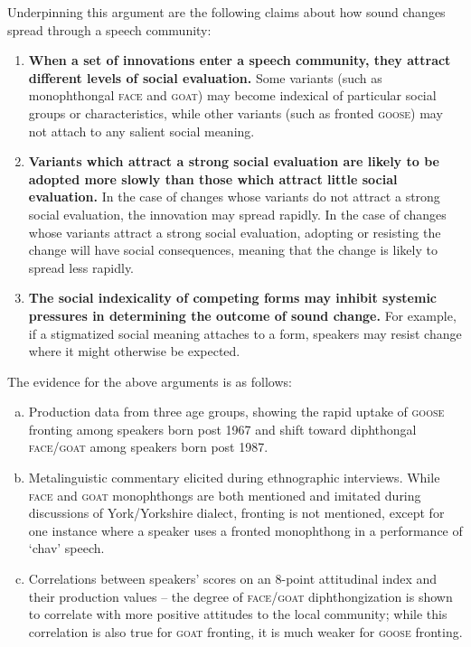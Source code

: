 \documentclass{article}
\begin{document}
Underpinning this argument are the following claims about how sound changes spread through a speech community:

\begin{enumerate}[i]

\item{\textbf{When a set of innovations enter a speech community, they attract different levels of social evaluation.} Some variants (such as monophthongal \textsc{\textsc{face}} and \textsc{\textsc{goat}}) may become indexical of particular social groups or characteristics, while other variants (such as fronted \textsc{\textsc{goose}}) may not attach to any salient social meaning.}
\item{\textbf{Variants which attract a strong social evaluation are likely to be adopted more slowly than those which attract little social evaluation.} In the case of changes whose variants do not attract a strong social evaluation, the innovation may spread rapidly. In the case of changes whose variants attract a strong social evaluation, adopting or resisting the change will have social consequences, meaning that the change is likely to spread less rapidly.}
\item{\textbf{The social indexicality of competing forms may inhibit systemic pressures in determining the outcome of sound change.} For example, if a stigmatized social meaning attaches to a form, speakers may resist change where it might otherwise be expected.}
\end{enumerate}

The evidence for the above arguments is as follows:

\begin{enumerate}[(a)]
\item{Production data from three age groups, showing the rapid uptake of \textsc{goose} fronting among speakers born post 1967 and shift toward diphthongal \textsc{face/goat} among speakers born post 1987.}
\item{Metalinguistic commentary elicited during ethnographic interviews. While \textsc{face} and \textsc{goat} monophthongs are both mentioned and imitated during discussions of York/Yorkshire dialect, fronting is not mentioned, except for one instance where a speaker uses a fronted monophthong in a performance of `chav' speech.}

\item{Correlations between speakers' scores on an 8-point attitudinal index and their production values -- the degree of \textsc{face}/\textsc{goat} diphthongization is shown to correlate with more positive attitudes to the local community; while this correlation is also true for \textsc{goat} fronting, it is much weaker for \textsc{goose} fronting.}

\end{enumerate}
\end{document}
